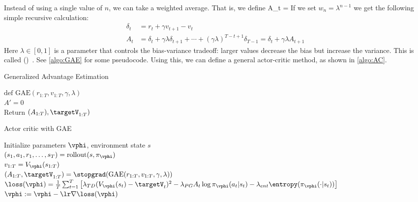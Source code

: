 
Instead of using a single value of $n$, we can take
a weighted average.
That is, we define
\be
A_t = 
\ee
If we set $w_n = \lambda^{n-1}$ we get the following simple recursive
calculation:
\begin{align}
  \delta_t &= r_t + \gamma v_{t+1} - v_t \\
  A_t &= \delta_t + \gamma \lambda \delta_{t+1} + \cdots +
  (\gamma \lambda)^{T-t+1} \delta_{T-1} = \delta_t + \gamma \lambda
  A_{t+1}
  \end{align}
Here $\lambda \in [0,1]$ is a parameter that controls the bias-variance
tradeoff: larger values decrease the bias but increase the variance.
This is called 
()~\citep{GAE}.
See \cref{algo:GAE} for some pseudocode.
Using this, we can define a general actor-critic
method, as shown in \cref{algo:AC}.

\begin{algorithm}
\dontprintsemicolon
\caption{Generalized Advantage Estimation}
\label{algo:GAE}
$\text{def GAE}(r_{1:T},v_{1:T}, \gamma, \lambda)$\\
$A'=0$ \\
Return $(A_{1:T}), \targetV_{1:T})$
\end{algorithm}


\begin{algorithm}
\dontprintsemicolon
\caption{Actor critic with GAE}
\label{algo:AC}
Initialize  parameters $\vphi$,
environment state $s$\\
{
  $(s_1,a_1,r_1,\ldots,s_T)= \text{rollout}(s, \pi_{\vphi})$ \\
  $v_{1:T} = V_{\vphi}(s_{1:T})$ \\
  $(A_{1:T}, \targetV_{1:T}) = \stopgrad(\text{GAE}(r_{1:T}, v_{1:T}, \gamma, \lambda))$
  \\
  $\loss(\vphi) = \frac{1}{T}\sum_{t=1}^T \left[
    \lambda_{TD} (V_{\vphi}(s_t) - \targetV_t)^2
    -\lambda_{PG} A_t \log \pi_{\vphi}(a_t|s_t)
    -\lambda_{ent} \entropy(\pi_{\vphi}(\cdot|s_t)) \right]$ \\
  $\vphi := \vphi - \lr \nabla \loss(\vphi)$
  }
\end{algorithm}



